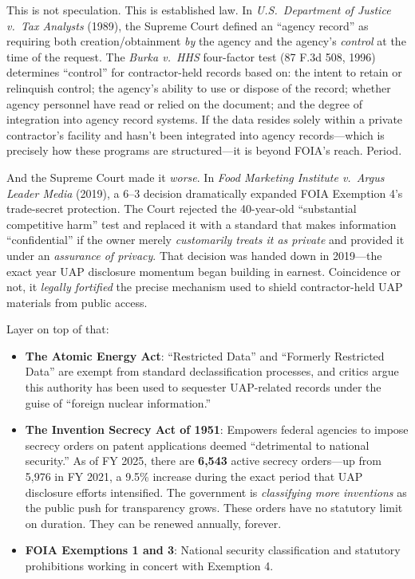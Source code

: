 \documentclass[11pt,a4paper]{article}
\begin{document}
This is not speculation. This is established law. In \textit{U.S.\ Department of Justice v.\ Tax Analysts} (1989), the Supreme Court defined an ``agency record'' as requiring both creation/obtainment \textit{by} the agency and the agency's \textit{control} at the time of the request. The \textit{Burka v.\ HHS} four-factor test (87 F.3d 508, 1996) determines ``control'' for contractor-held records based on: the intent to retain or relinquish control; the agency's ability to use or dispose of the record; whether agency personnel have read or relied on the document; and the degree of integration into agency record systems. If the data resides solely within a private contractor's facility and hasn't been integrated into agency records---which is precisely how these programs are structured---it is beyond FOIA's reach. Period.

And the Supreme Court made it \textit{worse}. In \textit{Food Marketing Institute v.\ Argus Leader Media} (2019), a 6--3 decision dramatically expanded FOIA Exemption 4's trade-secret protection. The Court rejected the 40-year-old ``substantial competitive harm'' test and replaced it with a standard that makes information ``confidential'' if the owner merely \textit{customarily treats it as private} and provided it under an \textit{assurance of privacy}. That decision was handed down in 2019---the exact year UAP disclosure momentum began building in earnest. Coincidence or not, it \textit{legally fortified} the precise mechanism used to shield contractor-held UAP materials from public access.

Layer on top of that:

\begin{itemize}[nosep]
    \item \textbf{The Atomic Energy Act}: ``Restricted Data'' and ``Formerly Restricted Data'' are exempt from standard declassification processes, and critics argue this authority has been used to sequester UAP-related records under the guise of ``foreign nuclear information.''
    \item \textbf{The Invention Secrecy Act of 1951}: Empowers federal agencies to impose secrecy orders on patent applications deemed ``detrimental to national security.'' As of FY 2025, there are \textbf{6,543} active secrecy orders---up from 5,976 in FY 2021, a 9.5\% increase during the exact period that UAP disclosure efforts intensified. The government is \textit{classifying more inventions} as the public push for transparency grows. These orders have no statutory limit on duration. They can be renewed annually, forever.
    \item \textbf{FOIA Exemptions 1 and 3}: National security classification and statutory prohibitions working in concert with Exemption 4.
\end{itemize}
\end{document}
